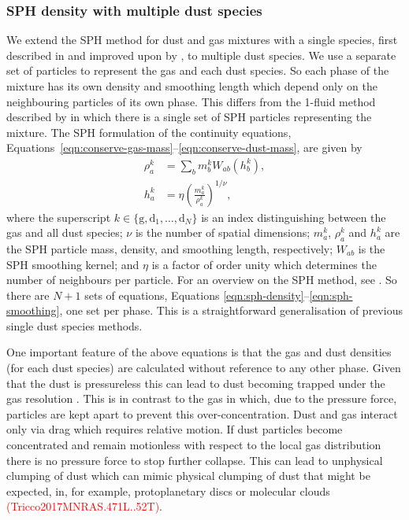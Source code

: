 \documentclass[fleqn,usenatbib]{mnras}
\newcommand{\g}{\mathrm{g}}
\newcommand{\dd}{\mathrm{d}}
\begin{document}
\subsubsection{SPH density with multiple dust species}

We extend the SPH method for dust and gas mixtures with a single species, first
described in \citet{Monaghan1995CoPhC..87..225M} and improved upon by
\citet{Laibe2012MNRAS.420.2345L,Laibe2012MNRAS.420.2365L}, to multiple dust
species. We use a separate set of particles to represent the gas and each dust
species. So each phase of the mixture has its own density and smoothing length
which depend only on the neighbouring particles of its own phase. This differs
from the 1-fluid method described by \citet{Hutchison2018MNRAS.476.2186H} in
which there is a single set of SPH particles representing the mixture. The SPH
formulation of the continuity equations,
Equations~\ref{eqn:conserve-gas-mass}--\ref{eqn:conserve-dust-mass}, are given
by
%
\begin{align}
   \label{eqn:sph-density}
   \rho^k_a &= \sum_b m^k_b W_{ab}(h^k_b), \\
   h^k_a &= \eta \left(\frac{m^k_a}{\rho^k_a}\right)^{1/\nu},
   \label{eqn:sph-smoothing}
\end{align}
%
where the superscript \(k \in \{\g, \dd_1, \dots, \dd_N\}\) is an index
distinguishing between the gas and all dust species; \(\nu\) is the number of
spatial dimensions; \(m^k_a\), \(\rho^k_a\) and \(h^k_a\) are the SPH particle
mass, density, and smoothing length, respectively; \(W_{ab}\) is the SPH
smoothing kernel; and \(\eta\) is a factor of order unity which determines the
number of neighbours per particle. For an overview on the SPH method, see
\citet{Monaghan1992ARA&A..30..543M, Monaghan2005RPPh...68.1703M,
Price2012JCoPh.231..759P}. So there are \(N + 1\) sets of equations, Equations
\ref{eqn:sph-density}--\ref{eqn:sph-smoothing}, one set per phase. This is a
straightforward generalisation of previous single dust species methods.

One important feature of the above equations is that the gas and dust densities
(for each dust species) are calculated without reference to any other phase.
Given that the dust is pressureless this can lead to dust becoming trapped under
the gas resolution \citep{Laibe2012MNRAS.420.2345L}. This is in contrast to the
gas in which, due to the pressure force, particles are kept apart to prevent
this over-concentration. Dust and gas interact only via drag which requires
relative motion. If dust particles become concentrated and remain motionless
with respect to the local gas distribution there is no pressure force to stop
further collapse. This can lead to unphysical clumping of dust which can mimic
physical clumping of dust that might be expected, in, for example,
protoplanetary discs or molecular clouds
\textcolor{red}{(Tricco2017MNRAS.471L..52T)}.
\end{document}
